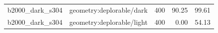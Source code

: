 \begin{longtable}{l>{\raggedright\arraybackslash}p{.42\linewidth}rrr}
b2000\_\allowbreak{}dark\_\allowbreak{}s304 & %
geometry:deplorable/dark & %
400 & %
90.25 & %
99.61 \\ %

b2000\_\allowbreak{}dark\_\allowbreak{}s304 & %
geometry:deplorable/light & %
400 & %
0.00 & %
54.13 \\ %


\end{longtable}
